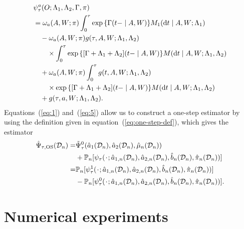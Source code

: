 \begin{equation}
  \label{eq:5}
  \begin{split}
    & \psi_{\tau}^a(O; \Lambda_1, \Lambda_2, \Gamma, \pi)
    \\
    & =
      \omega_a(A,W; \pi)
      \int_0^{\tau} \exp{\{{\Gamma(t- \mid A, W)}\}}   
      M_1(\mathop{}\!\mathrm{d} t \mid A, W; \Lambda_1)
    \\
    & \quad
      -
      \omega_a(A,W; \pi)
      g(\tau, A, W; \Lambda_1, \Lambda_2)
    \\
    & \quad \quad \times
      \int_0^{\tau}
      \exp{\{{[\Gamma+\Lambda_1 + \Lambda_2](t- \mid A, W)}\}}
      M(\mathop{}\!\mathrm{d} t \mid A, W; \Lambda_1, \Lambda_2)
    \\
    & \quad
      +
      \omega_a(A,W; \pi)      
      \int_0^{\tau}
      g(t, A, W; \Lambda_1, \Lambda_2)
    \\
    & \quad \quad \times
      \exp{\{{[\Gamma+\Lambda_1 + \Lambda_2](t- \mid A, W)}\}}
      M(\mathop{}\!\mathrm{d} t \mid A, W; \Lambda_1, \Lambda_2)
    \\
    & \quad + g(\tau, a, W; \Lambda_1, \Lambda_2).
  \end{split}
\end{equation}
Equations~(\ref{eq:1}) and~(\ref{eq:5}) allow us to construct a one-step
estimator by using the definition given in equation~(\ref{eq:one-step-def}),
which gives the estimator
\begin{equation}
  \label{eq:one-step-comp-ate}
  \begin{split}
    \hat{\Psi}_{\tau,\text{OS}}(\data_n)
    = &
        \tilde{\Psi}_{\tau}^0(\hat{a}_1(\data_n), \hat{a}_2(\data_n),
        \hat{\mu}_n(\data_n))
    \\
      &
        +
        \empmeas{[\psi_{\tau}(\blank; \hat{a}_{1,n}(\data_n), \hat{a}_{2,n}(\data_n),
        \hat{b}_n(\data_n), \hat{\pi}_n(\data_n))]}
    \\
    = &
        \empmeas{[\psi_{\tau}^1(\blank; \hat{a}_{1,n}(\data_n), \hat{a}_{2,n}(\data_n),
        \hat{b}_n(\data_n), \hat{\pi}_n(\data_n))]}
    \\
      &
        - \empmeas{[\psi_{\tau}^0(\blank; \hat{a}_{1,n}(\data_n), \hat{a}_{2,n}(\data_n),
        \hat{b}_n(\data_n), \hat{\pi}_n(\data_n))]}.
  \end{split}
\end{equation}

\section{Numerical experiments}
\label{sec:numer-exper}


